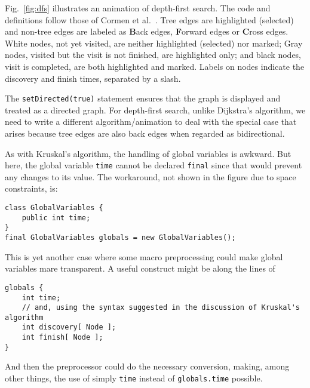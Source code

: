 

Fig.~\ref{fig:dfs} illustrates an animation of depth-first search.
The code and definitions follow those of Cormen et al.~\cite{2009-Intro_to_Algorithms-Cormen}.
Tree edges are highlighted (selected)
and non-tree edges are labeled as \textbf{B}ack edges,
\textbf{F}orward edges or \textbf{C}ross edges.
White nodes, not yet visited,
are neither highlighted (selected) nor marked;
Gray nodes, visited but the visit is not finished, are highlighted only;
and black nodes, visit is completed, are both highlighted and 
marked.
Labels on nodes indicate the discovery and finish times, separated by a slash.

The \verb+setDirected(true)+ statement
ensures that the graph is displayed and treated as a directed graph.
For depth-first search, unlike Dijkstra's algorithm, we need to write a different algorithm/animation to deal with the special case that arises because tree
edges are also back edges when regarded as bidirectional.

As with Kruskal's algorithm, the handling of global variables is awkward.
But here, the global variable \verb+time+ cannot be declared \verb+final+
since that would prevent any changes to its value. The workaround, not shown
in the figure due to space constraints, is:

\begin{verbatim}
class GlobalVariables {
    public int time;
}
final GlobalVariables globals = new GlobalVariables();
\end{verbatim}

This is yet another case where some macro preprocessing could make global
variables mare transparent. A useful construct might be along the lines of
\begin{verbatim}
globals {
    int time;
    // and, using the syntax suggested in the discussion of Kruskal's algorithm
    int discovery[ Node ];
    int finish[ Node ];
}
\end{verbatim}
And then the preprocessor could do the necessary conversion, making, among
other things, the use of simply \verb+time+ instead of \verb+globals.time+
possible.



